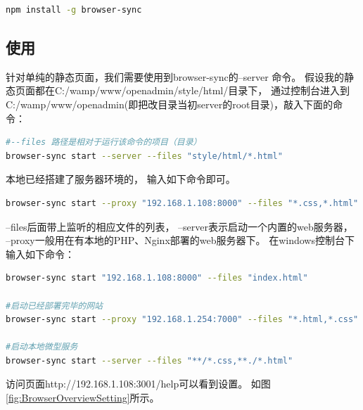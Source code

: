 \documentclass{book}
\begin{document}
\begin{lstlisting}[language=bash]
npm install -g browser-sync
\end{lstlisting}

\subsection{使用}

针对单纯的静态页面，我们需要使用到browser-sync的--server 命令。
假设我的静态页面都在C:/wamp/www/openadmin/style/html/目录下，
通过控制台进入到C:/wamp/www/openadmin(即把改目录当初server的root目录)，敲入下面的命令：

\begin{lstlisting}[language=bash]
#--files 路径是相对于运行该命令的项目（目录）
browser-sync start --server --files "style/html/*.html"
\end{lstlisting}

本地已经搭建了服务器环境的，
输入如下命令即可。

\begin{lstlisting}[language=bash]
browser-sync start --proxy "192.168.1.108:8000" --files "*.css,*.html"
\end{lstlisting}

--files后面带上监听的相应文件的列表，
--server表示启动一个内置的web服务器，
--proxy一般用在有本地的PHP、Nginx部署的web服务器下。
在windows控制台下输入如下命令：

\begin{lstlisting}[language=bash]
browser-sync start "192.168.1.108:8000" --files "index.html"

#启动已经部署完毕的网站
browser-sync start --proxy "192.168.1.254:7000" --files "*.html,*.css"

#启动本地微型服务
browser-sync start --server --files "**/*.css,**./*.html"
\end{lstlisting}

访问页面http://192.168.1.108:3001/help可以看到设置。
如图\ref{fig:BrowserOverviewSetting}所示。
\end{document}
